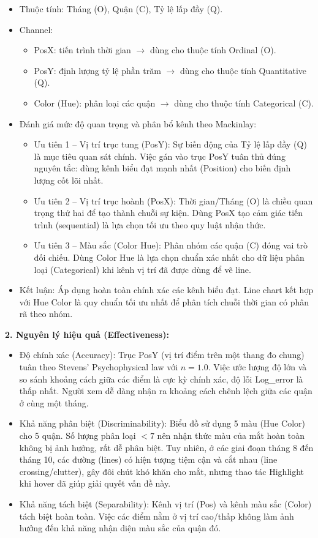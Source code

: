 \begin{itemize}
    \item Thuộc tính: Tháng (O), Quận (C), Tỷ lệ lấp đầy (Q).
    \item Channel:
    \begin{itemize}
        \item PosX: tiến trình thời gian $\rightarrow$ dùng cho thuộc tính Ordinal (O).
        \item PosY: định lượng tỷ lệ phần trăm $\rightarrow$ dùng cho thuộc tính Quantitative (Q).
        \item Color (Hue): phân loại các quận $\rightarrow$ dùng cho thuộc tính Categorical (C).
    \end{itemize}
    \item Đánh giá mức độ quan trọng và phân bổ kênh theo Mackinlay:
    \begin{itemize}
        \item Ưu tiên 1 -- Vị trí trục tung (PosY): Sự biến động của Tỷ lệ lấp đầy (Q) là mục tiêu quan sát chính. Việc gán vào trục PosY tuân thủ đúng nguyên tắc: dùng kênh biểu đạt mạnh nhất (Position) cho biến định lượng cốt lõi nhất.
        \item Ưu tiên 2 -- Vị trí trục hoành (PosX): Thời gian/Tháng (O) là chiều quan trọng thứ hai để tạo thành chuỗi sự kiện. Dùng PosX tạo cảm giác tiến trình (sequential) là lựa chọn tối ưu theo quy luật nhận thức.
        \item Ưu tiên 3 -- Màu sắc (Color Hue): Phân nhóm các quận (C) đóng vai trò đối chiếu. Dùng Color Hue là lựa chọn chuẩn xác nhất cho dữ liệu phân loại (Categorical) khi kênh vị trí đã được dùng để vẽ line.
    \end{itemize}
    \item Kết luận: Áp dụng hoàn toàn chính xác các kênh biểu đạt. Line chart kết hợp với Hue Color là quy chuẩn tối ưu nhất để phân tích chuỗi thời gian có phân rã theo nhóm.
\end{itemize}

\textbf{2. Nguyên lý hiệu quả (Effectiveness):}

\begin{itemize}
    \item Độ chính xác (Accuracy): Trục PosY (vị trí điểm trên một thang đo chung) tuân theo Stevens' Psychophysical law với $n = 1.0$. Việc ước lượng độ lớn và so sánh khoảng cách giữa các điểm là cực kỳ chính xác, độ lỗi Log\_error là thấp nhất. Người xem dễ dàng nhận ra khoảng cách chênh lệch giữa các quận ở cùng một tháng.
    \item Khả năng phân biệt (Discriminability): Biểu đồ sử dụng 5 màu (Hue Color) cho 5 quận. Số lượng phân loại $< 7$ nên nhận thức màu của mắt hoàn toàn không bị ảnh hưởng, rất dễ phân biệt. Tuy nhiên, ở các giai đoạn tháng 8 đến tháng 10, các đường (lines) có hiện tượng tiệm cận và cắt nhau (line crossing/clutter), gây đôi chút khó khăn cho mắt, nhưng thao tác Highlight khi hover đã giúp giải quyết vấn đề này.
    \item Khả năng tách biệt (Separability): Kênh vị trí (Pos) và kênh màu sắc (Color) tách biệt hoàn toàn. Việc các điểm nằm ở vị trí cao/thấp không làm ảnh hưởng đến khả năng nhận diện màu sắc của quận đó.
\end{itemize}

